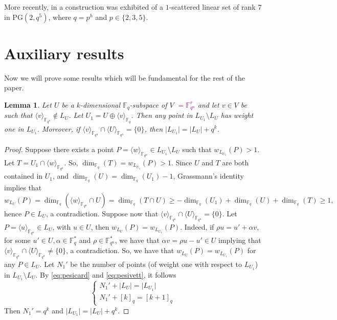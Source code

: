 \documentclass[11pt]{amsart}
\newtheorem{lemma}[theorem]{Lemma}
\newcommand{\fqn}{\mathbb{F}_{q^n}}
\newcommand{\F}{{\mathbb F}}
\newcommand{\fq}{{\mathbb F}_{q}}
\newcommand{\PG}{\mathrm{PG}}
\newcommand{\sam}[1]{\textcolor{purple}{#1}}
\begin{document}
More recently, in \cite{bartoli2021evasive} a construction was exhibited of a $1$-scattered linear set of rank $7$ in $\PG(2,q^5)$, where $q=p^h$ and $p \in \{2,3,5\}$.

\section{Auxiliary results}\label{sec:aux}

Now we will prove some results which will be fundamental for the rest of the paper.

\begin{lemma} \label{lem:extensionpoint}
Let $U$ be a $k$-dimensional $\F_q$-subspace of $V$ \sam{$= \fqn^r$} and let $v \in V$ be such that $\langle v \rangle_{\F_{q^n}} \notin L_{U} $. Let $U_1=U \oplus \langle v \rangle_{\F_q}$. Then any point in $L_{U_1} \setminus L_{U}$ has weight one in $L_{U_1}$. Moreover, if $\langle v \rangle_{\F_{q^n}} \cap \langle U \rangle_{\F_{q^n}}=\{0\}$, then $\lvert L_{U_1} \rvert = \lvert L_{U} \rvert+q^k$.
\end{lemma}
\begin{proof}
Suppose there exists a point $P=\langle w \rangle_{\F_{q^n}} \in L_{U_1} \setminus L_{U}$ such that $w_{L_{U_1}}(P) >1$. Let $T=U_1 \cap \langle w \rangle_{\F_{q^n}}$. So, $\dim_{\F_q}(T)=w_{L_{U_1}}(P) >1$.
Since $U$ and $T$ are both contained in $U_1$, and $\dim_{\F_q} (U) = \dim_{\F_q} (U_1) - 1$, Grassmann's identity implies that
\[
w_{L_{U}}(P)= \dim_{\F_q} (\langle w \rangle_{\F_{q^n}} \cap U) =
 \dim_{\F_q} (T \cap U) \geq -\dim_{\F_q}(U_1) + \dim_{\F_q} (U) + \dim_{\F_q} (T) \geq 1,
\]
hence $P \in L_{U}$, a contradiction.
Suppose now that $\langle v \rangle_{\F_{q^n}} \cap \langle U \rangle_{\F_{q^n}}=\{0\}$. 
Let $P=\langle u \rangle_{\F_{q^n}} \in L_{U}$, with $u \in U$, then $w_{L_{U}}(P)=w_{L_{U_1}}(P)$. Indeed, 
if $\rho u=u'+\alpha v$, for some $u' \in U, \alpha \in \fq^*$ and $\rho \in \fqn^*$, we have that $\alpha v=\rho u-u'\in U$ 
implying that $\langle v \rangle_{\F_{q^n}} \cap \langle U \rangle_{\F_{q^n}} \neq \{0\}$, a contradiction. So, we have that $w_{L_{U}}(P)=w_{L_{U_1}}(P)$ for any $P \in L_{U}$.  Let $N_1'$ be the number of points (of weight one with respect to $L_{U_1}$) in $L_{U_1} \setminus L_{U}$. By \eqref{eq:pesicard} and \eqref{eq:pesivett}, it follows 
\[
\begin{cases}
N_1'+\lvert L_{U} \rvert= \lvert L_{U_1} \rvert \\
N_1'+[k]_q=[k+1]_q
\end{cases}
\]
Then $N_1'=q^k$ and $\lvert L_{U_1} \rvert =\lvert L_{U} \rvert+q^k$.
\end{proof}
\end{document}
